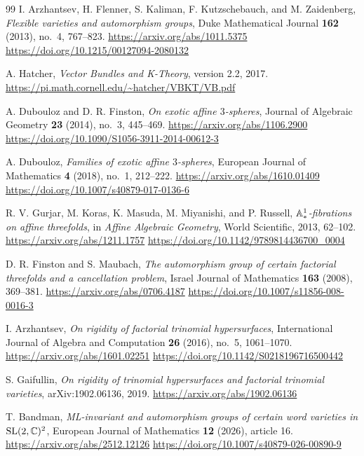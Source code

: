 \begin{thebibliography}{99}
I. Arzhantsev, H. Flenner, S. Kaliman, F. Kutzschebauch, and M. Zaidenberg,
\emph{Flexible varieties and automorphism groups},
Duke Mathematical Journal \textbf{162} (2013), no.~4, 767--823.
\url{https://arxiv.org/abs/1011.5375}\quad
\url{https://doi.org/10.1215/00127094-2080132}

A. Hatcher,
\emph{Vector Bundles and K-Theory},
version 2.2, 2017.
\url{https://pi.math.cornell.edu/~hatcher/VBKT/VB.pdf}

A. Dubouloz and D. R. Finston,
\emph{On exotic affine $3$-spheres},
Journal of Algebraic Geometry \textbf{23} (2014), no.~3, 445--469.
\url{https://arxiv.org/abs/1106.2900}\quad
\url{https://doi.org/10.1090/S1056-3911-2014-00612-3}

A. Dubouloz,
\emph{Families of exotic affine $3$-spheres},
European Journal of Mathematics \textbf{4} (2018), no.~1, 212--222.
\url{https://arxiv.org/abs/1610.01409}\quad
\url{https://doi.org/10.1007/s40879-017-0136-6}

R. V. Gurjar, M. Koras, K. Masuda, M. Miyanishi, and P. Russell,
\emph{$\mathbb A^1_*$-fibrations on affine threefolds},
in \emph{Affine Algebraic Geometry}, World Scientific, 2013, 62--102.
\url{https://arxiv.org/abs/1211.1757}\quad
\url{https://doi.org/10.1142/9789814436700_0004}

D. R. Finston and S. Maubach,
\emph{The automorphism group of certain factorial threefolds and a cancellation problem},
Israel Journal of Mathematics \textbf{163} (2008), 369--381.
\url{https://arxiv.org/abs/0706.4187}\quad
\url{https://doi.org/10.1007/s11856-008-0016-3}

I. Arzhantsev,
\emph{On rigidity of factorial trinomial hypersurfaces},
International Journal of Algebra and Computation \textbf{26} (2016), no.~5, 1061--1070.
\url{https://arxiv.org/abs/1601.02251}\quad
\url{https://doi.org/10.1142/S0218196716500442}

S. Gaifullin,
\emph{On rigidity of trinomial hypersurfaces and factorial trinomial varieties},
arXiv:1902.06136, 2019.
\url{https://arxiv.org/abs/1902.06136}

T. Bandman,
\emph{ML-invariant and automorphism groups of certain word varieties in $\operatorname{SL}(2,\mathbb C)^2$},
European Journal of Mathematics \textbf{12} (2026), article 16.
\url{https://arxiv.org/abs/2512.12126}\quad
\url{https://doi.org/10.1007/s40879-026-00890-9}

\end{thebibliography}

